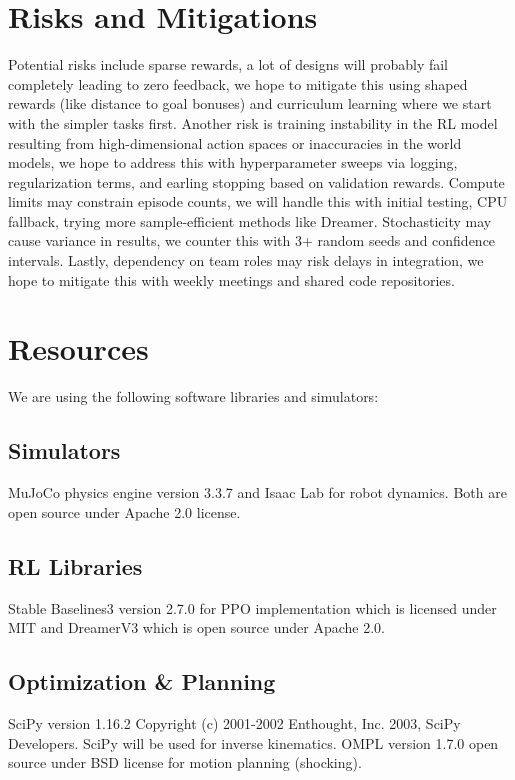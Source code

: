 \documentclass[conference]{IEEEtran}
\begin{document}
\section{Risks and Mitigations}
Potential risks include sparse rewards, a lot of designs will probably fail completely leading to zero feedback, we hope to mitigate this using shaped rewards (like distance to goal bonuses) and curriculum learning where we start with the simpler tasks first.
Another risk is training instability in the RL model resulting from high-dimensional action spaces or inaccuracies in the world models, we hope to address this with hyperparameter sweeps via logging, regularization terms, and earling stopping based on validation rewards.
Compute limits may constrain episode counts, we will handle this with initial testing, CPU fallback, trying more sample-efficient methods like Dreamer.
Stochasticity may cause variance in results, we counter this with 3+ random seeds and confidence intervals.
Lastly, dependency on team roles may risk delays in integration, we hope to mitigate this with weekly meetings and shared code repositories.

\section{Resources}
We are using the following software libraries and simulators:

\subsection{Simulators}
MuJoCo physics engine version 3.3.7 and Isaac Lab for robot dynamics.
Both are open source under Apache 2.0 license.

\subsection{RL Libraries}
Stable Baselines3 version 2.7.0 for PPO implementation which is licensed under MIT and DreamerV3 which is open source under Apache 2.0.

\subsection{Optimization \& Planning}
SciPy version 1.16.2 Copyright (c) 2001-2002 Enthought, Inc. 2003, SciPy Developers.
SciPy will be used for inverse kinematics.
OMPL version 1.7.0 open source under BSD license for motion planning (shocking).
\end{document}
